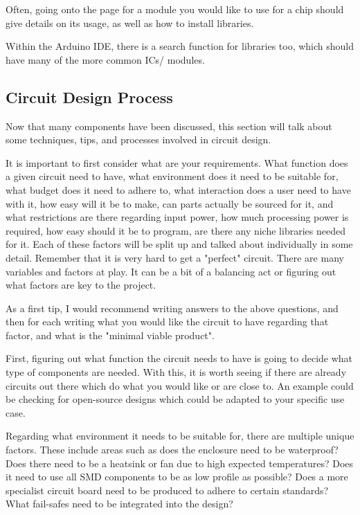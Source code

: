 \documentclass[a4paper,11pt]{report}
\begin{document}
Often, going onto the page for a module you would like to use for a chip should give details on its usage, as well as how to install libraries.

Within the Arduino IDE, there is a search function for libraries too, which should have many of the more common ICs/ modules.

\subsection{Circuit Design Process}

Now that many components have been discussed, this section will talk about some techniques, tips, and processes involved in circuit design.

It is important to first consider what are your requirements. What function does a given circuit need to have, what environment does it need to be suitable for, what budget does it need to adhere to, what interaction does a user need to have with it, how easy will it be to make, can parts actually be sourced for it, and what restrictions are there regarding input power, how much processing power is required, how easy should it be to program, are there any niche libraries needed for it. Each of these factors will be split up and talked about individually in some detail. Remember that it is very hard to get a "perfect" circuit. There are many variables and factors at play. It can be a bit of a balancing act or figuring out what factors are key to the project.

As a first tip, I would recommend writing answers to the above questions, and then for each writing what you would like the circuit to have regarding that factor, and what is the "minimal viable product".

First, figuring out what function the circuit needs to have is going to decide what type of components are needed. With this, it is worth seeing if there are already circuits out there which do what you would like or are close to. An example could be checking for open-source designs which could be adapted to your specific use case.

Regarding what environment it needs to be suitable for, there are multiple unique factors. These include areas such as does the enclosure need to be waterproof? Does there need to be a heatsink or fan due to high expected temperatures? Does it need to use all SMD components to be as low profile as possible? Does a more specialist circuit board need to be produced to adhere to certain standards? What fail-safes need to be integrated into the design?
\end{document}
